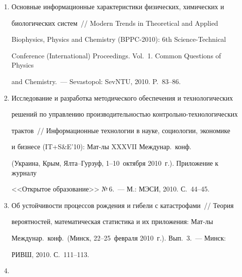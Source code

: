 \begin{enumerate}[1.]





 процессов~/\!\!/  Интеллектуализация 


обработки информации: VIII Междунар.\ конф.\ (Пафос, Кипр, 


17--24~октября 2010~г.): Сборник докладов.~--- М.: МАКС Пресс, 2010. 


С.~224--227.


\item {}


Основные информационные характеристики физических, химических и 


биологических сис\-тем~/\!\!/  Modern Trends in Theoretical and Applied 


Biophysics, Physics and Chemistry (BPPC-2010): 6th Science-Technical 


Conference (International) Proceedings. Vol.~1. Common Questions of Physics 


and Chemistry.~--- Sevastopol: SevNTU, 2010. P.~83--86.


\item {}


Исследование и разработка методического обеспечения и технологических 


решений по управлению производи\-тель\-ностью контрольно-технологических 


трактов~/\!\!/  Информационные технологии в науке, социологии, экономике 


и бизнесе (IT\;+\;S\&E'10): Мат-лы XXXVII Междунар.\ конф.\ 


(Украина, Крым, Ялта--Гурзуф, 1--10~октября 2010~г.). Приложение к журналу 


<<Открытое образование>> №\,6.~--- М.: МЭСИ, 2010. С.~44--45.


\item {}


Об устойчивости процессов рождения и гибели с катастрофами~/\!\!/  Теория 


вероятностей, математическая статистика и их приложения: Мат-лы 


Междунар.\ конф.\ (Минск, 22--25~февраля 2010~г.). Вып.~3.~--- Минск: 


РИВШ, 2010. С.~111--113.


\item {}



\end{enumerate}
